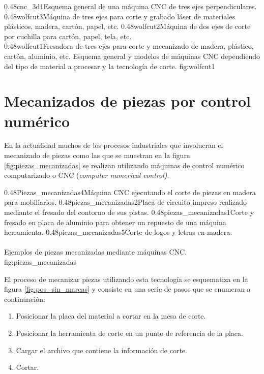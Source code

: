 \subfigtwotwo
{0.48}{cnc_3d1}{Esquema general de una máquina CNC de tres ejes perpendiculares.\\ \vphantom{1}}
            {0.48}{wolfcut3}{Máquina de tres ejes para corte y grabado láser de materiales plásticos, madera, cartón, papel, etc.}
            {0.48}{wolfcut2}{Máquina de dos ejes de corte por cuchilla para cartón, papel, tela, etc.\\ \vphantom{1}}
            {0.48}{wolfcut1}{Fresadora de tres ejes para corte y mecanizado de madera, plástico, cartón, aluminio, etc.}
            {Esquema general y modelos de máquinas CNC dependiendo del tipo de material a procesar y la tecnología de corte.}
            {fig:wolfcut1}


\section{Mecanizados de piezas por control numérico}

En la actualidad muchos de los procesos industriales que involucran el mecanizado de piezas como las que se muestran en la figura \ref{fig:piezas_mecanizadas} se realizan utilizando máquinas de control numérico computarizado o CNC \citep{WEBSITE:cncwiki} (\textit{computer numerical control)}.

\subfigtwotwo 
         {0.48}{Piezas_mecanizadas4}{Máquina CNC ejecutando el corte de piezas en madera para mobiliarios.} 
         {0.48}{piezas_mecanizadas2}{Placa de circuito impreso realizado mediante el fresado del contorno de sus pistas.}
         {0.48}{piezas_mecanizadas1}{Corte y fresado en placa de aluminio para obtener un repuesto de una máquina herramienta.}
         {0.48}{piezas_mecanizadas5}{Corte de logos y letras en madera. \\ \vphantom{10}\\ \vphantom{10}}
         {Ejemplos de piezas mecanizadas mediante máquinas CNC.}
         {fig:piezas_mecanizadas}


         El proceso de mecanizar piezas utilizando esta tecnología se esquematiza en la figura \ref{fig:pos_sin_marcas} y consiste en una serie de pasos que se enumeran a continuación:

\begin{enumerate}
   \item{Posicionar la placa del material a cortar en la mesa de corte.}
   \item{Posicionar la herramienta de corte en un punto de referencia de la placa.}
   \item{Cargar el archivo que contiene la información de corte.}
   \item{Cortar.}
\end{enumerate}

